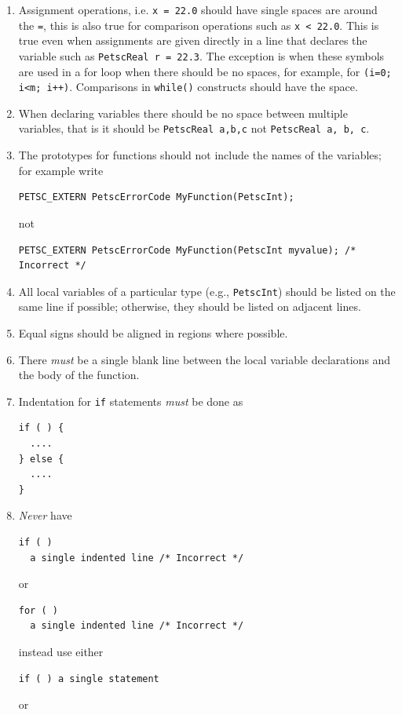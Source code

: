 \begin{enumerate}
\item Assignment operations, i.e. \lstinline{x = 22.0} should have single spaces are around the \lstinline{=}, this is also true for
comparison operations such as \lstinline{x < 22.0}. This is true even
when assignments are given directly in a line that declares the
variable such as \lstinline{PetscReal r = 22.3}. The exception is when
these symbols are used in a for loop when there should be no spaces,
for example, for \lstinline{(i=0; i<m; i++)}. Comparisons
in \lstinline{while()} constructs should have the space.
\item When declaring variables there should be no space between multiple variables, that is it should be \lstinline{PetscReal a,b,c} not \lstinline{PetscReal a, b, c}.
\item The prototypes for functions should not include the names of the variables; for example write
\begin{lstlisting}
PETSC_EXTERN PetscErrorCode MyFunction(PetscInt);
\end{lstlisting}
not
\begin{lstlisting}
PETSC_EXTERN PetscErrorCode MyFunction(PetscInt myvalue); /* Incorrect */
\end{lstlisting}
\item All local variables of a particular type (e.g., \lstinline{PetscInt}) should be
      listed on the same line if possible; otherwise, they should be listed
      on adjacent lines.
\item Equal signs should be aligned in regions where possible.
\item There {\em must} be a single blank line
      between the local variable declarations and the body of the function.
\item Indentation for \lstinline{if} statements {\em must}  be done  as
\begin{lstlisting}
if ( ) {
  ....
} else {
  ....
}
\end{lstlisting}
\item {\em Never} have
\begin{lstlisting}
if ( ) 
  a single indented line /* Incorrect */
\end{lstlisting}
or
\begin{lstlisting}
for ( ) 
  a single indented line /* Incorrect */
\end{lstlisting}
instead use either
\begin{lstlisting}
if ( ) a single statement
\end{lstlisting}
or
\begin{lstlisting}

\end{lstlisting}
\end{enumerate}
